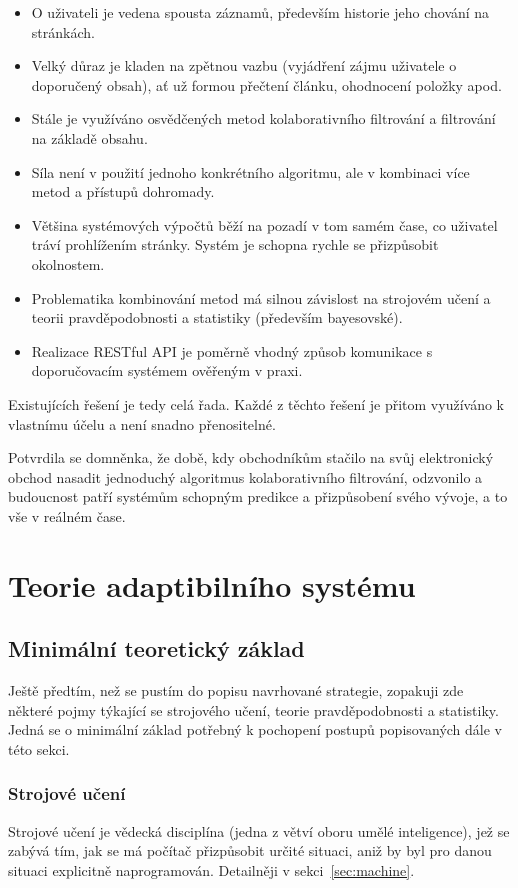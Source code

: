 \documentclass[thesis=M,czech]{FITthesis}[2014/05/07]
\begin{document}
\begin{itemize}
	\item O uživateli je vedena spousta záznamů, především historie jeho chování na stránkách.
	\item Velký důraz je kladen na zpětnou vazbu (vyjádření zájmu uživatele o doporučený obsah), ať už formou přečtení článku, ohodnocení položky apod.
	\item Stále je využíváno osvědčených metod kolaborativního filtrování a filtrování na základě obsahu.
	\item Síla není v použití jednoho konkrétního algoritmu, ale v kombinaci více metod a přístupů dohromady.
	\item Většina systémových výpočtů běží na pozadí v tom samém čase, co uživatel tráví prohlížením stránky. Systém je schopna rychle se přizpůsobit okolnostem.
	\item Problematika kombinování metod má silnou závislost na strojovém učení a teorii pravděpodobnosti a statistiky (především bayesovské).
	\item Realizace RESTful API je poměrně vhodný způsob komunikace s doporučovacím systémem ověřeným v praxi.
\end{itemize}

Existujících řešení je tedy celá řada. Každé z těchto řešení je přitom využíváno k vlastnímu účelu a není snadno přenositelné.

Potvrdila se domněnka, že době, kdy obchodníkům stačilo na svůj elektronický obchod nasadit jednoduchý algoritmus kolaborativního filtrování, odzvonilo a budoucnost patří systémům schopným predikce a přizpůsobení svého vývoje, a to vše v reálném čase. 

\section{Teorie adaptibilního systému}
\label{chap:adapt}

\subsection{Minimální teoretický základ}

Ještě předtím, než se pustím do popisu navrhované strategie, zopakuji zde některé pojmy týkající se strojového učení, teorie pravděpodobnosti a statistiky. Jedná se o minimální základ potřebný k pochopení postupů popisovaných dále v této sekci. 

\subsubsection{Strojové učení}
Strojové učení je vědecká disciplína (jedna z větví oboru umělé inteligence), jež se zabývá tím, jak se má počítač přizpůsobit určité situaci, aniž by byl pro danou situaci explicitně naprogramován. Detailněji v sekci~\ref{sec:machine}.
\end{document}
